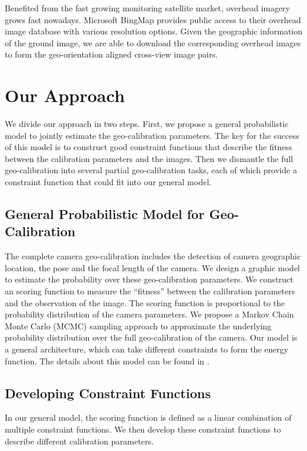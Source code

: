 Benefited from the fast growing monitoring satellite market, overhead
imagery grows fast nowadays. Microsoft BingMap provides public access
to their overhead image database with various resolution options.
Given the geographic information of the ground image, we are able to
download the corresponding overhead images to form the geo-orientation
aligned cross-view image pairs.

\section{Our Approach}
We divide our approach in two steps. First, we propose a general
probabilistic model to jointly estimate the geo-calibration
parameters. The key for the success of this model is to construct good
constraint functions that describe the fitness between the calibration
parameters and the images. Then we dismantle the full geo-calibration
into several partial geo-calibration tasks, each of which provide a
constraint function that could fit into our general model.

\subsection{General Probabilistic Model for Geo-Calibration}
The complete camera geo-calibration includes the detection of camera
geographic location, the pose and the focal length of the camera.  We
design a graphic model to estimate the probability over these
geo-calibration parameters. 
We construct an scoring function to measure the ``fitness'' between
the calibration parameters and the observation of the image. The
scoring function is proportional to the probability distribution of
the camera parameters. We propose a Markov Chain Monte Carlo (MCMC)
sampling approach to approximate the underlying probability
distribution over the full geo-calibration of the camera.
Our model is a general architecture, which can take different
constraints to form the energy function. The details about this model
can be found in .

\subsection{Developing Constraint Functions}
In our general model, the scoring function is defined as a linear
combination of multiple constraint functions. We then develop
these constraint functions to describe different calibration
parameters.

